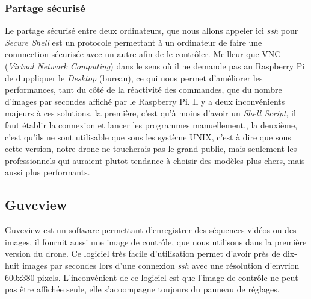 \documentclass[a4paper,11pt]{report}
\begin{document}
{\subsubsection{Partage sécurisé}

Le partage sécurisé entre deux ordinateurs, que nous allons appeler ici \textit{ssh} pour \textit{Secure Shell} est un protocole permettant à un ordinateur de faire une connnection sécurisée avec un autre afin de le contrôler. Meilleur que VNC (\textit{Virtual Network Computing}) dans le sens où il ne demande pas au Raspberry Pi de duppliquer le \textit{Desktop} (bureau), ce qui nous permet d'améliorer les performances, tant du côté de la réactivité des commandes, que du nombre d'images par secondes affiché par le Raspberry Pi. Il y a deux inconvénients majeurs à ces solutions, la première, c'est qu'à moins d'avoir un \textit{Shell Script}, il faut établir la connexion et lancer les programmes manuellement., la deuxième, c'est qu'ils ne sont utilisable que sous les système UNIX, c'est à dire que sous cette version, notre drone ne toucherais pas le grand public, mais seulement les professionnels qui auraient plutot tendance à choisir des modèles plus chers, mais aussi plus performants. 

\subsection{Guvcview}

Guvcview\label{Guvcview} est un software permettant d'enregistrer des séquences vidéos ou des images, il fournit aussi une image de contrôle, que nous utilisons dans la première version du drone. Ce logiciel très facile d'utilisation permet d'avoir près de dix-huit images par secondes lors d'une connexion \textit{ssh} avec une résolution d'envrion 600x380 pixels. L'inconvénient de ce logiciel est que l'image de contrôle ne peut pas être affichée seule, elle s'acoompagne toujours du panneau de réglages. 

}
\end{document}
